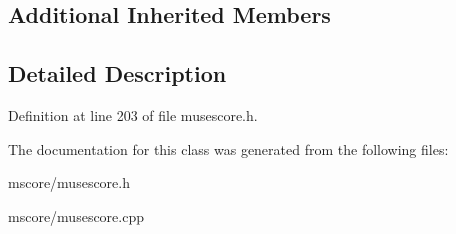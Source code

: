 \subsection*{Additional Inherited Members}


\subsection{Detailed Description}


Definition at line 203 of file musescore.\+h.



The documentation for this class was generated from the following files\+:\begin{DoxyCompactItemize}
\item 
mscore/musescore.\+h\item 
mscore/musescore.\+cpp\end{DoxyCompactItemize}
